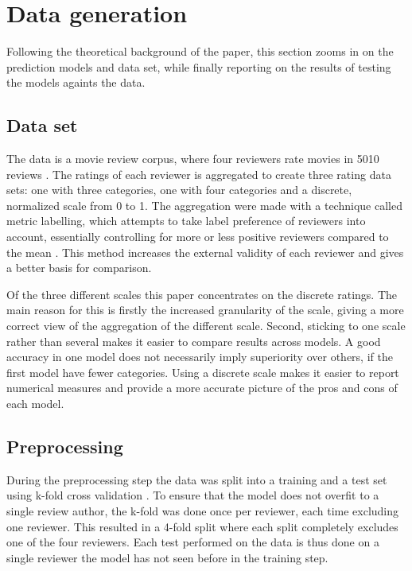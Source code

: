 \documentclass[a4paper]{article}
\begin{document}
\section{Data generation}
Following the theoretical background of the paper, this section zooms in on
the prediction models and data set, while finally reporting on the results of
testing the models againts the data.

\subsection{Data set}
\label{sec:dataset}
The data is a movie review corpus, where four reviewers rate movies in 5010
reviews \citep{PangLee2005}. The ratings of each reviewer is aggregated
to create three rating data sets: one with three categories,
one with four categories and a discrete, normalized scale from 0 to 1. The aggregation
were made with a technique called metric labelling, which attempts to take
label preference of reviewers into account, essentially controlling for more
or less positive reviewers compared to the mean \citep{PangLee2005}. This method
increases the external validity of each reviewer and gives a better basis
for comparison.

Of the three different scales this paper concentrates on the discrete ratings.
The main reason for this is firstly the increased granularity of the scale, giving a
more correct view of the aggregation of the different scale. Second, sticking
to one scale rather than several makes it easier to compare results across
models. A good accuracy in one model does not necessarily imply superiority
over others, if the first model have fewer categories. Using a discrete scale
makes it easier to report numerical measures and provide a more accurate
picture of the pros and cons of each model.

\subsection{Preprocessing}
During the preprocessing step the data was split into a training and a test
set using k-fold cross validation \citep{Russell2009}. To ensure that the
model does not overfit to a single review author, the k-fold was done once
per reviewer, each time excluding one reviewer. This resulted in a 4-fold split
where each split completely excludes one of the four reviewers. Each test
performed on the data is thus done on a single reviewer the model has not
seen before in the training step.
\end{document}
